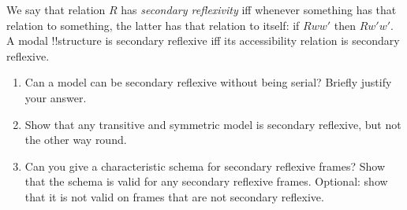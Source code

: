 \documentclass[../../../include/open-logic-section]{subfiles}
\begin{document}
\begin{prob}
    We say that relation $R$ has \emph{secondary reflexivity} iff 
    whenever something has that relation to something, the latter has
    that relation to itself: if $Rww'$ then $Rw'w'$. A modal !!{structure}
    is secondary reflexive iff its accessibility relation is secondary 
    reflexive.

    \begin{enumerate}
    \item Can a model can be secondary reflexive without 
    being serial? Briefly justify your answer.
    \item Show that any transitive and symmetric model is secondary 
    reflexive, but not the other way round.
    \item Can you give a characteristic schema for secondary reflexive 
    frames? Show that the schema is valid for any secondary reflexive frames.
    Optional: show that it is not valid on frames that are not secondary 
    reflexive.
    \end{enumerate}
    
\end{prob}
\end{document}
